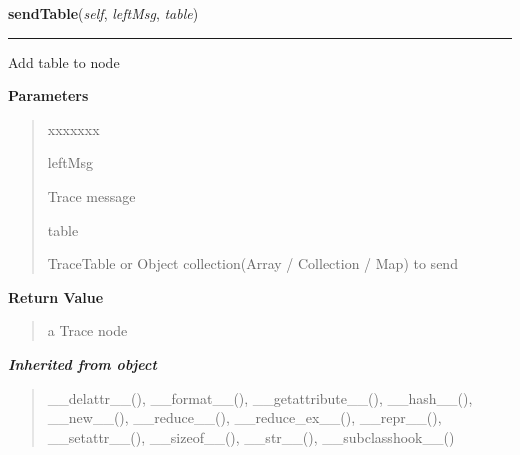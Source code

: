\hspace{.8\funcindent}\begin{boxedminipage}{\funcwidth}

    \raggedright \textbf{sendTable}(\textit{self}, \textit{leftMsg}, \textit{table})

    \vspace{-1.5ex}

    \rule{\textwidth}{0.5\fboxrule}
\setlength{\parskip}{2ex}
    Add table to node

\setlength{\parskip}{1ex}
      \textbf{Parameters}
      \vspace{-1ex}

      \begin{quote}
        \begin{Ventry}{xxxxxxx}

          \item[leftMsg]

          Trace message

          \item[table]

          TraceTable or Object collection(Array / Collection / Map) to send

        \end{Ventry}

      \end{quote}

      \textbf{Return Value}
    \vspace{-1ex}

      \begin{quote}
      a Trace node

      \end{quote}

    \end{boxedminipage}


\large{\textbf{\textit{Inherited from object}}}

\begin{quote}
\_\_delattr\_\_(), \_\_format\_\_(), \_\_getattribute\_\_(), \_\_hash\_\_(), \_\_new\_\_(), \_\_reduce\_\_(), \_\_reduce\_ex\_\_(), \_\_repr\_\_(), \_\_setattr\_\_(), \_\_sizeof\_\_(), \_\_str\_\_(), \_\_subclasshook\_\_()
\end{quote}


